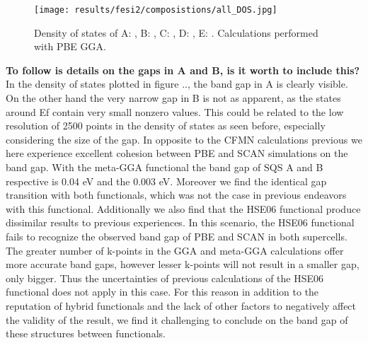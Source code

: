 \begin{figure}[H]
\hskip-5cm\texttt{[image: results/fesi2/composistions/all\_DOS.jpg]}
\caption{Density of states of A: , B: , C: , D: , E: . Calculations performed with PBE GGA.}
\end{figure}


\textbf{To follow is details on the gaps in A and B, is it worth to include this?}
In the density of states plotted in figure .., the band gap in A is clearly visible. On the other hand the very narrow gap in B is not as apparent, as the states around Ef contain very small nonzero values.  This could be related to the low resolution of 2500 points in the density of states as seen before, especially considering the size of the gap. In opposite to the CFMN calculations previous we here experience excellent cohesion between PBE and SCAN simulations on the band gap. With the meta-GGA functional the band gap of SQS A and B respective is 0.04 eV and the 0.003 eV. Moreover we find the identical gap transition with both functionals, which was not the case in previous endeavors with this functional. Additionally we also find that the HSE06 functional produce dissimilar results to previous experiences. In this scenario, the HSE06 functional fails to recognize the observed band gap of PBE and SCAN in both supercells. The greater number of k-points in the GGA and meta-GGA calculations offer more accurate band gaps, however lesser k-points will not result in a smaller gap, only bigger. Thus the uncertainties of previous calculations of the HSE06 functional does not apply in this case. For this reason in addition to the reputation of hybrid functionals and the lack of other factors to negatively affect the validity of the result, we find it challenging to conclude on the band gap of these structures between functionals.

